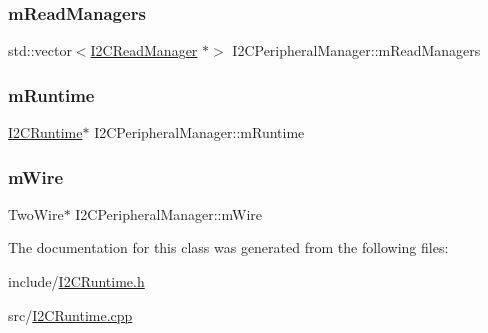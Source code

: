 \subsubsection{\texorpdfstring{m\+Read\+Managers}{mReadManagers}}
{\footnotesize\ttfamily std\+::vector$<$\mbox{\hyperlink{class_i2_c_read_manager}{I2\+C\+Read\+Manager}} $\ast$$>$ I2\+C\+Peripheral\+Manager\+::m\+Read\+Managers\hspace{0.3cm}{\ttfamily [private]}}

\mbox{\label{class_i2_c_peripheral_manager_a7dbb8937bebdd3e21d88728f02656422}} 
\subsubsection{\texorpdfstring{m\+Runtime}{mRuntime}}
{\footnotesize\ttfamily \mbox{\hyperlink{class_i2_c_runtime}{I2\+C\+Runtime}}$\ast$ I2\+C\+Peripheral\+Manager\+::m\+Runtime\hspace{0.3cm}{\ttfamily [private]}}

\mbox{\label{class_i2_c_peripheral_manager_a348d218edc48d69e21f8a0e204fde50a}} 
\subsubsection{\texorpdfstring{m\+Wire}{mWire}}
{\footnotesize\ttfamily Two\+Wire$\ast$ I2\+C\+Peripheral\+Manager\+::m\+Wire\hspace{0.3cm}{\ttfamily [private]}}



The documentation for this class was generated from the following files\+:\begin{DoxyCompactItemize}
\item 
include/\mbox{\hyperlink{_i2_c_runtime_8h}{I2\+C\+Runtime.\+h}}\item 
src/\mbox{\hyperlink{_i2_c_runtime_8cpp}{I2\+C\+Runtime.\+cpp}}\end{DoxyCompactItemize}
